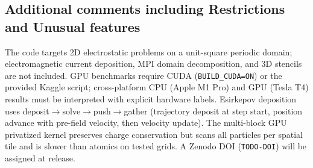 \subsection*{Additional comments including Restrictions and Unusual features}
The code targets 2D electrostatic problems on a unit-square periodic domain; electromagnetic current deposition, MPI domain decomposition, and 3D stencils are not included.
GPU benchmarks require CUDA (\texttt{BUILD\_CUDA=ON}) or the provided Kaggle script; cross-platform CPU (Apple M1 Pro) and GPU (Tesla T4) results must be interpreted with explicit hardware labels.
Esirkepov deposition uses deposit$\rightarrow$solve$\rightarrow$push$\rightarrow$gather (trajectory deposit at step start, position advance with pre-field velocity, then velocity update).
The multi-block GPU privatized kernel preserves charge conservation but scans all particles per spatial tile and is slower than atomics on tested grids.
A Zenodo DOI (\texttt{TODO-DOI}) will be assigned at release.
